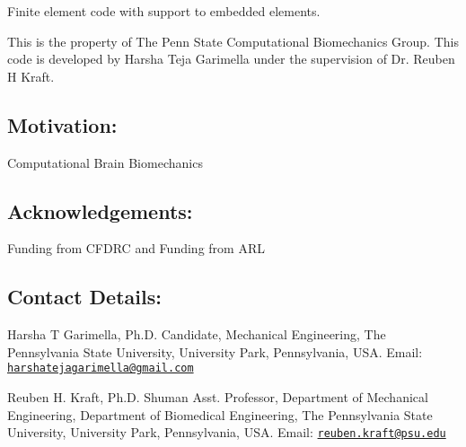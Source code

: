 Finite element code with support to embedded elements.

This is the property of The Penn State Computational Biomechanics Group. This code is developed by Harsha Teja Garimella under the supervision of Dr. Reuben H Kraft.

\subsection*{Motivation\+:}

Computational Brain Biomechanics

\subsection*{Acknowledgements\+:}

Funding from C\+F\+D\+RC and Funding from A\+RL

\subsection*{Contact Details\+:}

Harsha T Garimella, Ph.\+D. Candidate, Mechanical Engineering, The Pennsylvania State University, University Park, Pennsylvania, U\+SA. Email\+: \href{mailto:harshatejagarimella@gmail.com}{\tt harshatejagarimella@gmail.\+com}

Reuben H. Kraft, Ph.\+D. Shuman Asst. Professor, Department of Mechanical Engineering, Department of Biomedical Engineering, The Pennsylvania State University, University Park, Pennsylvania, U\+SA. Email\+: \href{mailto:reuben.kraft@psu.edu}{\tt reuben.\+kraft@psu.\+edu} 